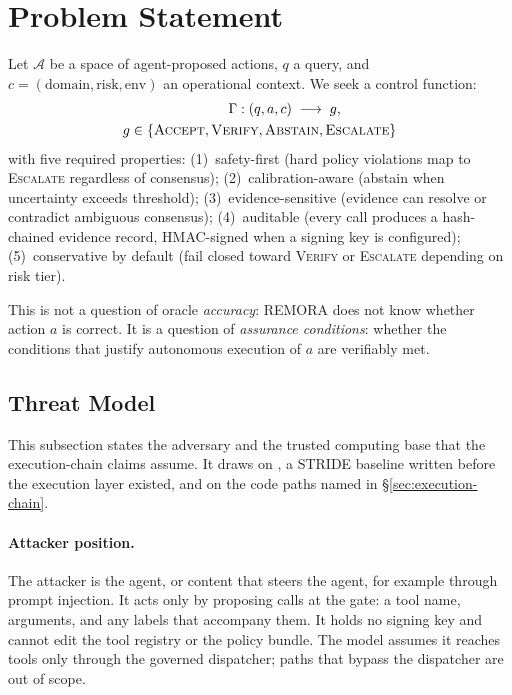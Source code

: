 \documentclass[10pt,twocolumn]{article}
\newcommand{\Gate}{\Gamma}
\begin{document}
\section{Problem Statement}
\label{sec:problem}

Let $\mathcal{A}$ be a space of agent-proposed actions, $q$ a query,
and $c = (\text{domain}, \text{risk}, \text{env})$ an operational
context. We seek a control function:
%
\begin{equation}
\begin{split}
\Gate: (q, a, c) \;\longrightarrow\; g, \qquad\qquad\\
g \in \{\textsc{Accept}, \textsc{Verify}, \textsc{Abstain}, \textsc{Escalate}\}
\end{split}
\end{equation}
%
with five required properties: (1)~safety-first (hard policy violations
map to \textsc{Escalate} regardless of consensus); (2)~calibration-aware \cite{guo2017calibration}
(abstain when uncertainty exceeds threshold); (3)~evidence-sensitive
(evidence can resolve or contradict ambiguous consensus);
(4)~auditable (every call produces a hash-chained evidence record,
HMAC-signed when a signing key is configured);
(5)~conservative by default (fail closed toward \textsc{Verify} or \textsc{Escalate} depending on risk tier).

This is not a question of oracle \emph{accuracy}: REMORA does not
know whether action $a$ is correct. It is a question of
\emph{assurance conditions}: whether the conditions that justify
autonomous execution of $a$ are verifiably met.

\subsection{Threat Model}
\label{sec:threat-model}

This subsection states the adversary and the trusted computing base that
the execution-chain claims assume. It draws on
, a STRIDE baseline written before
the execution layer existed, and on the code paths named in
\S\ref{sec:execution-chain}.

\paragraph{Attacker position.} The attacker is the agent, or content that
steers the agent, for example through prompt injection. It acts only by
proposing calls at the gate: a tool name, arguments, and any labels that
accompany them. It holds no signing key and cannot edit the tool registry
or the policy bundle. The model assumes it reaches tools only through the
governed dispatcher; paths that bypass the dispatcher are out of scope.
\end{document}
